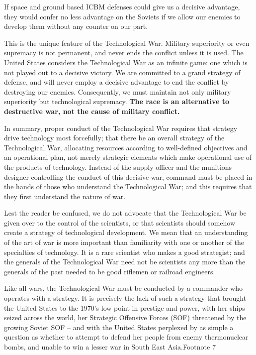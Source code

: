 If space and ground based ICBM defenses could give us a decisive advantage, they would confer no less advantage on the Soviets if we allow our enemies to develop them without any counter on our part.

This is the unique feature of the Technological War. Military superiority or even supremacy is not permanent, and never ends the conflict unless it is used. The United States considers the Technological War as an infinite game: one which is not played out to a decisive victory. We are committed to a grand strategy of defense, and will never employ a decisive advantage to end the conflict by destroying our enemies. Consequently, we must maintain not only military superiority but technological supremacy. \textbf{The race is an alternative to destructive war, not the cause of military conflict.}

In summary, proper conduct of the Technological War requires that strategy drive technology most forcefully; that there be an overall strategy of the Technological War, allocating resources according to well-defined objectives and an operational plan, not merely strategic elements which make operational use of the products of technology. Instead of the supply officer and the munitions designer controlling the conduct of this decisive war, command must be placed in the hands of those who understand the Technological War; and this requires that they first understand the nature of war.

Lest the reader be confused, we do not advocate that the Technological War be given over to the control of the scientists, or that scientists should somehow create a strategy of technological development. We mean that an understanding of the art of war is more important than familiarity with one or another of the specialties of technology. It is a rare scientist who makes a good strategist; and the generals of the Technological War need not be scientists any more than the generals of the past needed to be good riflemen or railroad engineers.

Like all wars, the Technological War must be conducted by a commander who operates with a strategy. It is precisely the lack of such a strategy that brought the United States to the 1970's low point in prestige and power, with her ships seized across the world, her Strategic Offensive Forces (SOF) threatened by the growing Soviet SOF -- and with the United States perplexed by as simple a question as whether to attempt to defend her people from enemy thermonuclear bombs, and unable to win a lesser war in South East Asia.Footnote 7

